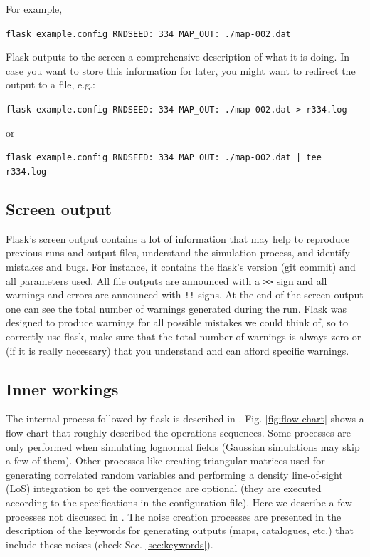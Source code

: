 \documentclass[12pt]{book} %
\begin{document}
\noindent
For example,

\vspace{0.5cm}
\noindent
{\tt flask example.config RNDSEED: 334 MAP\_OUT: ./map-002.dat}
\vspace{0.5cm}

{\sc Flask} outputs to the screen a comprehensive description of what it is doing. In case you want to 
store this information for later, you might want to redirect the output to a file, e.g.: 

\vspace{0.5cm}
\noindent
{\tt flask example.config RNDSEED: 334 MAP\_OUT: ./map-002.dat > r334.log}

\noindent
or

\noindent
{\tt flask example.config RNDSEED: 334 MAP\_OUT: ./map-002.dat | tee r334.log}
\vspace{0.5cm}


\subsection{Screen output}
\label{sec:screen}

{\sc Flask}'s screen output contains a lot of information that may help 
to reproduce previous runs and output files, understand the simulation process, 
and identify mistakes and bugs. For instance, it contains the {\sc flask}'s version 
(git commit) and all parameters used. All file outputs are announced with a {\tt >>} sign 
and all warnings and errors are announced with {\tt !!} signs. At the end of the 
screen output one can see the total number of warnings generated during the run. 
{\sc Flask} was designed to produce warnings for all possible mistakes we could think of, so 
to correctly use {\sc flask}, make sure that the total number of warnings is always zero 
or (if it is really necessary) that you understand and can afford specific warnings.
   

\subsection{Inner workings}
\label{sec:workings}

The internal process followed by {\sc flask} is described in \citet{Xavier16mn}. 
Fig. \ref{fig:flow-chart} shows a flow chart that roughly described the 
operations sequences. Some processes are only performed when simulating lognormal 
fields (Gaussian simulations may skip a few of them). Other processes like 
creating triangular matrices used for generating correlated random variables and 
performing a density line-of-sight (LoS) integration to get the convergence are 
optional (they are executed according to the specifications in the configuration file).
Here we describe a few processes not discussed in \citet{Xavier16mn}. The noise 
creation processes are presented in the description of the keywords for generating 
outputs (maps, catalogues, etc.) that include these noises (check Sec. \ref{sec:keywords}).  
\end{document}
